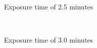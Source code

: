 \begin{figure}[htb]
\begin{subfigure}[t]{0.32\linewidth}
  	\caption{Exposure time of 2.5 minutes}
  	\label{fig:b3e1}
 \end{subfigure}\\
     \begin{subfigure}[t]{0.32\linewidth}
  	\caption{Exposure time of 3.0 minutes}
  	\label{fig:b3b2}
 \end{subfigure}
\hfill
     \begin{subfigure}[t]{0.32\linewidth}

\end{subfigure}
\end{figure}
